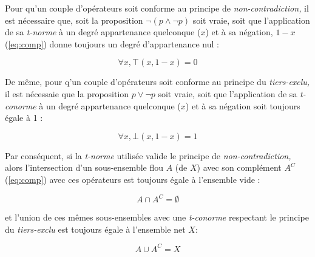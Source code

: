 Pour qu'un couple d'opérateurs soit conforme au principe de
\emph{non-contradiction,} il est nécessaire que, soit la proposition
\(\neg (p \wedge \neg p)\) soit vraie, soit que l’application de sa
\emph{t-norme} à un degré appartenance quelconque (\(x\)) et à sa
négation, \(1-x\) (\autoref{eq:comp}) donne toujours un degré
d'appartenance nul :

\begin{equation}
  \forall x, ⊤(x,1-x) = 0
\end{equation}

De même, pour q'un couple d'opérateurs soit conforme au principe du
\emph{tiers-exclu,} il est nécessaie que la proposition
\(p \vee \neg p\) soit vraie, soit que l’application de sa
\emph{t-conorme} à un degré appartenance quelconque (\(x\)) et à sa
négation soit toujours égale à 1 :

\begin{equation}
  \forall x, ⊥(x,1-x) = 1
\end{equation}

Par conséquent, si la \emph{t-norme} utilisée valide le principe de
\emph{non-contradiction,} alors l'intersection d'un sous-ensemble flou
\(A\) (de \(X\)) avec son complément \(A^C\) (\autoref{eq:comp}) avec
ces opérateurs est toujours égale à l'ensemble vide :

\begin{equation}
  \label{eq:ensemble_LNC}
  A \cap A^C = \emptyset
\end{equation}

et l'union de ces mêmes sous-ensembles avec une \emph{t-conorme}
respectant le principe du \emph{tiers-exclu} est toujours égale à
l'ensemble net \(X\):

\begin{equation}
  \label{eq:ensemble_LEM}
  A \cup A^C = X
\end{equation}

